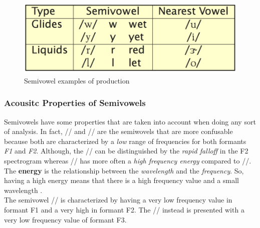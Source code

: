 \begin{figure}[!ht]
    \centering
    \includegraphics[scale=0.5]{Figures/semivowel_examples.png}
    \caption{Semivowel examples of production \cite{mit_phonetics}}
    \label{fig:semivowel_ex}
\end{figure}


\subsubsection{Acousitc Properties of Semivowels}
\label{ssub:Acousitc Properties of Semivowels}
Semivowels have some properties that are taken into account when doing any sort of analysis. In fact, // and // are the semiwovels that are more confusable because both are characterized by a \textit{low} range of frequencies for both formants \textit{F1} and \textit{F2}. Although, the // can be distinguished by the \textit{rapid falloff} in the F2 spectrogram whereas // has more often a \textit{high frequency energy} compared to //. The \textbf{energy} is the relationship between the \textit{wavelength} and the \textit{frequency}. So, having a high energy means that there is a high frequency value and a small wavelength \cite{energy_relationship}. \\
\noindent The semivowel // is characterized by having a very low frequency value in formant F1 and a very high in formant F2. The // instead is presented with a very low frequency value of formant F3. \\



